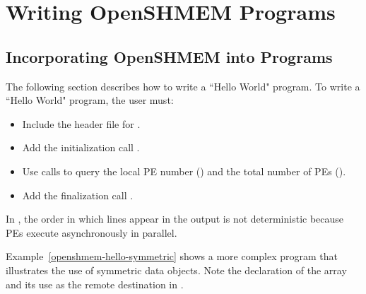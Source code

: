 \clearpage %

\appendix

\pagestyle{fancy}
\fancyhf{}
\fancyhead[RE, LO]{\leftmark}
\fancyhead[RO, LE]{\thepage}
\fancyfoot[CE, CO]{\thepage}
\renewcommand{\headrulewidth}{0pt}
\renewcommand{\thesection}{\thesectionOrig}




\chapter{Writing OpenSHMEM Programs}
\section*{Incorporating OpenSHMEM into Programs}\label{sec:writing_programs}

The following section describes how to write a ``Hello World" \openshmem program.
To write a ``Hello World" \openshmem program, the user must:

\begin{itemize}
\item Include the header file  for \Cstd.
\item Add the initialization call \hyperref[subsec:shmem_init]{}.
\item Use \openshmem calls to query the local \ac{PE} number
    (\hyperref[subsec:shmem_my_pe]{}) and the total number
    of \acp{PE} (\hyperref[subsec:shmem_n_pes]{}).
\item Add the finalization call \hyperref[subsec:shmem_finalize]{}.
\end{itemize}

In \openshmem, the order in which lines appear in the output is not
deterministic because \acp{PE} execute asynchronously in parallel.



\clearpage %

Example~\ref{openshmem-hello-symmetric} shows a more complex
\openshmem program that illustrates the use of symmetric data objects.
Note the declaration of the  array and its use as the
remote destination in \hyperref[subsec:shmem_put]{}.

